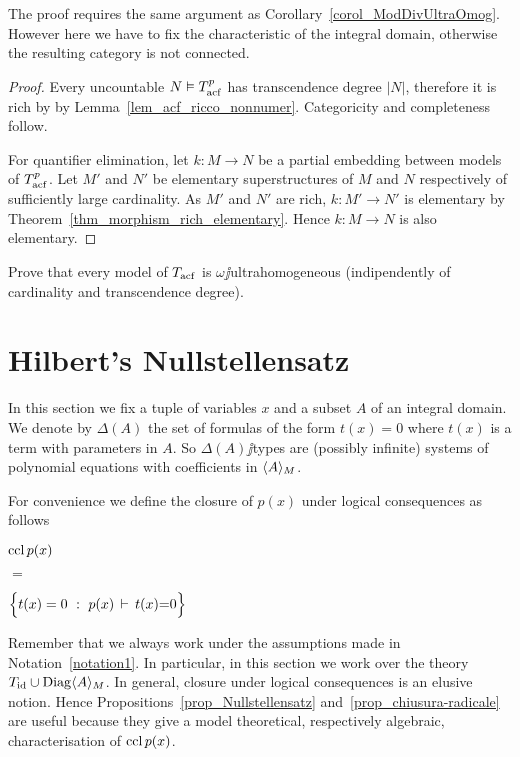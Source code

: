 \documentclass[creche.tex]{subfiles}
\begin{document}
The proof requires the same argument as Corollary~\ref{corol_ModDivUltraOmog}. However here we have to fix the characteristic of the integral domain, otherwise the resulting category is not connected. 

\begin{proof}
Every uncountable $N\models T^p_{\rm acf}$ has transcendence degree $|N|$, therefore it is rich by by Lemma~\ref{lem_acf_ricco_nonnumer}. Categoricity and completeness follow. 

For quantifier elimination, let $k:M\to N$ be a partial embedding between models of $T^p_{\rm acf}$. Let $M'$ and $N'$ be elementary superstructures of $M$ and $N$ respectively of sufficiently large cardinality. As $M'$ and $N'$ are rich, $k:M'\to N'$ is elementary by Theorem~\ref{thm_morphism_rich_elementary}. Hence 
 $k:M\to N$ is also elementary.
\end{proof}


\begin{exercise}
Prove that every model of $T_{\rm acf}$ is $\omega\jj$ultrahomogeneous (indipendently of cardinality and transcendence degree).\QED
\end{exercise}


\section{Hilbert's Nullstellensatz}
\label{Nullstellensatz}

\def\medrel#1{\parbox{5ex}{\hfil$\displaystyle #1$}}
\def\ceq#1#2#3{\parbox{20ex}{$\displaystyle #1$}\medrel{#2}$\displaystyle  #3$}

In this section we fix a tuple of variables \emph{$x$\/} and a subset \emph{$A$} of an integral domain. We denote by \emph{$\Delta(A)$\/} the set of formulas of the form $t(x)=0$ where $t(x)$ is a term with parameters in $A$. So $\Delta(A)\jj$types are (possibly infinite) systems of polynomial equations with coefficients in $\<A\>_M$. 

For convenience we define the closure of $p(x)$ under logical consequences as follows

\ceq{\hfill \ccl\, p(x)}{=}{\Big\{t(x)=0\ :\    p(x)\, \proves\, t(x){=}0\Big\}}

Remember that we always work under the assumptions made in Notation~\ref{notation1}. In particular, in this section we work over the theory $T_{\rm id}\cup\Diag\<A\>_M$. In general, closure under logical consequences is an elusive notion. Hence Propositions~\ref{prop_Nullstellensatz} and~\ref{prop_chiusura-radicale} are useful because they give a model theoretical, respectively algebraic, characterisation of $\ccl\, p(x)$.
\end{document}
